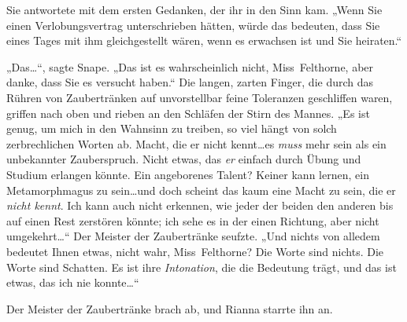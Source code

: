 Sie antwortete mit dem ersten Gedanken, der ihr in den Sinn kam. „Wenn Sie einen Verlobungsvertrag unterschrieben hätten, würde das bedeuten, dass Sie eines Tages mit ihm gleichgestellt wären, wenn es erwachsen ist und Sie heiraten.“

„Das…“, sagte Snape. „Das ist es wahrscheinlich nicht, Miss~Felthorne, aber danke, dass Sie es versucht haben.“ Die langen, zarten Finger, die durch das Rühren von Zaubertränken auf unvorstellbar feine Toleranzen geschliffen waren, griffen nach oben und rieben an den Schläfen der Stirn des Mannes. „Es ist genug, um mich in den Wahnsinn zu treiben, so viel hängt von solch zerbrechlichen Worten ab. Macht, die er nicht kennt…es \emph{muss} mehr sein als ein unbekannter Zauberspruch. Nicht etwas, das \emph{er} einfach durch Übung und Studium erlangen könnte. Ein angeborenes Talent? Keiner kann lernen, ein Metamorphmagus zu sein…und doch scheint das kaum eine Macht zu sein, die er \emph{nicht kennt}. Ich kann auch nicht erkennen, wie jeder der beiden den anderen bis auf einen Rest zerstören könnte; ich sehe es in der einen Richtung, aber nicht umgekehrt…“ Der Meister der Zaubertränke seufzte. „Und nichts von alledem bedeutet Ihnen etwas, nicht wahr, Miss~Felthorne? Die Worte sind nichts. Die Worte sind Schatten. Es ist ihre \emph{Intonation}, die die Bedeutung trägt, und das ist etwas, das ich nie konnte…“

Der Meister der Zaubertränke brach ab, und Rianna starrte ihn an.

